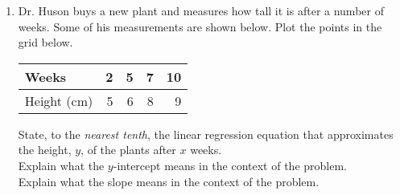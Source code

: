 \documentclass[12pt, oneside]{article}
\begin{document}
\begin{enumerate}
  Solve each equation for $y$.
  \begin{multicols}{2}
    \raggedcolumns
    \begin{enumerate}
      \item $x+y=5$\\[0.5cm]
    \end{enumerate}
    \begin{enumerate}
      \item $4x-2y=12$ \\[0.5cm]
    \end{enumerate}
  \end{multicols}

  \newpage


\subsubsection*{Fitting linear models and interpreting correlation}
\item Dr. Huson buys a new plant and measures how tall it is after a number of weeks. Some of his measurements are shown below. Plot the points in the grid below.
  \renewcommand{\arraystretch}{1.6}
    \begin{center}
      \begin{tabular}{|l|r|r|r|r|}
      \hline
      Weeks & 2 & 5 & 7 & 10\\
      \hline
      Height (cm) & 5 & 6 & 8 & 9 \\
      \hline
      \end{tabular}
    \end{center}

\begin{center} %
\end{center}
State, to the \emph{nearest tenth}, the linear regression equation that approximates the height, $y$, of the plants after $x$ weeks.\\[2cm]
Explain what the $y$-intercept means in the context of the problem. \\[3cm]
Explain what the slope means in the context of the problem.
\newpage

\end{enumerate}
\end{document}
